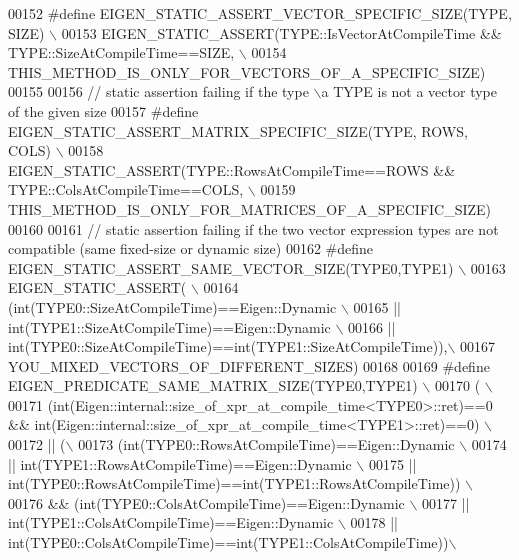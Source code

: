 \begin{DoxyCode}
00152 \textcolor{preprocessor}{#define EIGEN\_STATIC\_ASSERT\_VECTOR\_SPECIFIC\_SIZE(TYPE, SIZE) \(\backslash\)}
00153 \textcolor{preprocessor}{  EIGEN\_STATIC\_ASSERT(TYPE::IsVectorAtCompileTime && TYPE::SizeAtCompileTime==SIZE, \(\backslash\)}
00154 \textcolor{preprocessor}{                      THIS\_METHOD\_IS\_ONLY\_FOR\_VECTORS\_OF\_A\_SPECIFIC\_SIZE)}
00155 
00156 \textcolor{comment}{// static assertion failing if the type \(\backslash\)a TYPE is not a vector type of the given size}
00157 \textcolor{preprocessor}{#define EIGEN\_STATIC\_ASSERT\_MATRIX\_SPECIFIC\_SIZE(TYPE, ROWS, COLS) \(\backslash\)}
00158 \textcolor{preprocessor}{  EIGEN\_STATIC\_ASSERT(TYPE::RowsAtCompileTime==ROWS && TYPE::ColsAtCompileTime==COLS, \(\backslash\)}
00159 \textcolor{preprocessor}{                      THIS\_METHOD\_IS\_ONLY\_FOR\_MATRICES\_OF\_A\_SPECIFIC\_SIZE)}
00160 
00161 \textcolor{comment}{// static assertion failing if the two vector expression types are not compatible (same fixed-size or
       dynamic size)}
00162 \textcolor{preprocessor}{#define EIGEN\_STATIC\_ASSERT\_SAME\_VECTOR\_SIZE(TYPE0,TYPE1) \(\backslash\)}
00163 \textcolor{preprocessor}{  EIGEN\_STATIC\_ASSERT( \(\backslash\)}
00164 \textcolor{preprocessor}{      (int(TYPE0::SizeAtCompileTime)==Eigen::Dynamic \(\backslash\)}
00165 \textcolor{preprocessor}{    || int(TYPE1::SizeAtCompileTime)==Eigen::Dynamic \(\backslash\)}
00166 \textcolor{preprocessor}{    || int(TYPE0::SizeAtCompileTime)==int(TYPE1::SizeAtCompileTime)),\(\backslash\)}
00167 \textcolor{preprocessor}{    YOU\_MIXED\_VECTORS\_OF\_DIFFERENT\_SIZES)}
00168 
00169 \textcolor{preprocessor}{#define EIGEN\_PREDICATE\_SAME\_MATRIX\_SIZE(TYPE0,TYPE1) \(\backslash\)}
00170 \textcolor{preprocessor}{     ( \(\backslash\)}
00171 \textcolor{preprocessor}{        (int(Eigen::internal::size\_of\_xpr\_at\_compile\_time<TYPE0>::ret)==0 &&
       int(Eigen::internal::size\_of\_xpr\_at\_compile\_time<TYPE1>::ret)==0) \(\backslash\)}
00172 \textcolor{preprocessor}{    || (\(\backslash\)}
00173 \textcolor{preprocessor}{          (int(TYPE0::RowsAtCompileTime)==Eigen::Dynamic \(\backslash\)}
00174 \textcolor{preprocessor}{        || int(TYPE1::RowsAtCompileTime)==Eigen::Dynamic \(\backslash\)}
00175 \textcolor{preprocessor}{        || int(TYPE0::RowsAtCompileTime)==int(TYPE1::RowsAtCompileTime)) \(\backslash\)}
00176 \textcolor{preprocessor}{      &&  (int(TYPE0::ColsAtCompileTime)==Eigen::Dynamic \(\backslash\)}
00177 \textcolor{preprocessor}{        || int(TYPE1::ColsAtCompileTime)==Eigen::Dynamic \(\backslash\)}
00178 \textcolor{preprocessor}{        || int(TYPE0::ColsAtCompileTime)==int(TYPE1::ColsAtCompileTime))\(\backslash\)}

\end{DoxyCode}
